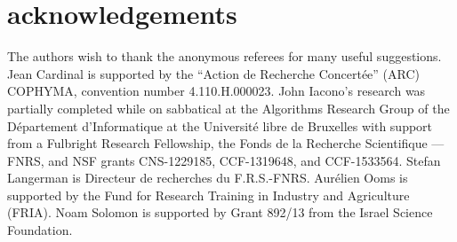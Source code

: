 \section{acknowledgements}

The authors wish to thank the anonymous referees for many useful suggestions.
%
Jean Cardinal is supported by the ``Action de Recherche Concert\'ee'' (ARC)
COPHYMA, convention number 4.110.H.000023.
%
John Iacono's research was
partially completed while on sabbatical at the
Algorithms Research Group of the
D\'{e}partement d'Informatique at the
Universit\'{e} libre de Bruxelles with support from
a Fulbright Research Fellowship,
the Fonds de la Recherche Scientifique --- FNRS,
and NSF grants CNS-1229185, CCF-1319648, and CCF-1533564.
%
Stefan Langerman is Directeur de recherches du F.R.S.-FNRS\@.
%
Aurélien Ooms is supported by the Fund for Research Training in Industry
and Agriculture (FRIA).
%
Noam Solomon is supported by Grant 892/13 from the Israel Science Foundation.
